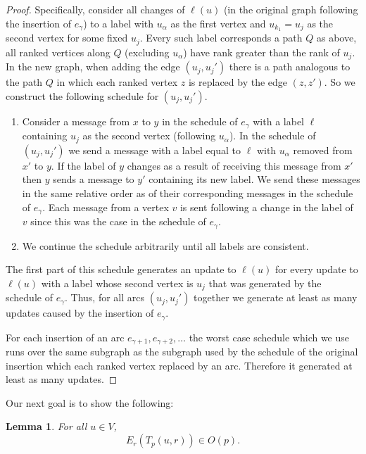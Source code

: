 \documentclass[11pt]{article}
\theoremstyle{plain}
\newtheorem{lem}[thm]{Lemma}
\theoremstyle{definition}
\theoremstyle{remark}
\numberwithin{equation}{section}
\begin{document}
\begin{proof}
Specifically, consider all changes of $\ell(u)$ (in the original
graph following the insertion of $e_\gamma$) to a label with
$u_\alpha$ as the first vertex and $u_{k_1}=u_j$ as the second
vertex for some fixed $u_j$. Every such label corresponds a path $Q$
as above, all ranked vertices along $Q$ (excluding $u_\alpha$) have
rank greater than the rank of $u_j$. In the new graph, when adding
the edge $(u_j, u_j')$ there is a path analogous to the path $Q$ in
which each ranked vertex $z$ is replaced by the edge $(z,z')$. So we
construct the following schedule for $(u_j, u_j')$.
\begin{enumerate}
\item
Consider a message from $x$ to $y$ in the schedule of $e_\gamma$
with a label $\ell$ containing $u_j$ as the second vertex (following
$u_\alpha$). In the schedule of $(u_j, u_j')$  we send a message
with a label equal to $\ell$ with $u_\alpha$ removed from $x'$ to
$y$. If the label of $y$ changes as a result of receiving this
message from $x'$ then $y$ sends a message to $y'$ containing its
new label. We send these messages in the same relative order as of
their corresponding messages in the schedule of $e_\gamma$.
Each message from
a vertex $v$ is sent following a change in the label of $v$ since
this was the case in the schedule of $e_\gamma$.
\item
We continue the schedule arbitrarily until all labels are
consistent.
\end{enumerate}
The first part of this schedule generates an update to $\ell(u)$ for
every update to $\ell(u)$ with a label whose second vertex is $u_j$
that was generated by the schedule of $e_\gamma$. Thus,  for all
arcs $(u_j,u_j')$ together we generate at least as many updates
caused by the insertion of $e_\gamma$.

For each insertion of an arc $e_{\gamma+1}, e_{\gamma+2},\dots$ the
worst case schedule which we use runs over the same subgraph as the
subgraph used by the schedule of the  original insertion which each
ranked vertex replaced by an arc. Therefore it generated at least as
many updates.
    \end{proof}



Our next goal is to show the following:


\begin{lem} \label{lem:changes}
For all $u\in V$, $$E_r(T_p(u,r)) \in O(p).$$
\end{lem}
\end{document}
